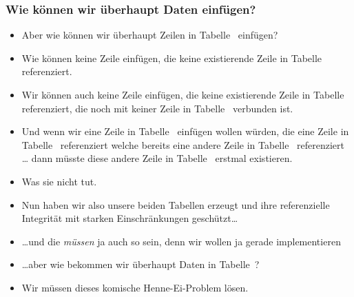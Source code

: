 %
\begin{frame}%
\frametitle{Wie können wir überhaupt Daten einfügen?}%
\begin{itemize}%
\item Aber wie können wir überhaupt Zeilen in Tabelle~ einfügen?%
%
\item<2-> Wie können keine Zeile einfügen, die keine existierende Zeile in Tabelle~ referenziert.%
%
\item<3-> Wir können auch keine Zeile einfügen, die keine existierende Zeile in Tabelle~ referenziert, die noch mit keiner Zeile in Tabelle~ verbunden ist.%
%
\item<4-> Und wenn wir eine Zeile in Tabelle~ einfügen wollen würden, die eine Zeile in Tabelle~ referenziert welche bereits eine andere Zeile in Tabelle~ referenziert {\dots} dann müsste diese andere Zeile in Tabelle~ erstmal existieren.%
%
\item<5-> Was sie nicht tut.%
%
\item<6-> Nun haben wir also unsere beiden Tabellen erzeugt und ihre referenzielle Integrität mit starken Einschränkungen geschützt{\dots}%
%
\item<7-> {\dots}und die \emph{müssen} ja auch so sein, denn wir wollen ja gerade  implementieren
%
\item<8->{\dots}aber wie bekommen wir überhaupt Daten in Tabelle~?%
%
\item<9-> Wir müssen dieses komische Henne-Ei-Problem lösen.%
\end{itemize}%
\end{frame}%
%
%
